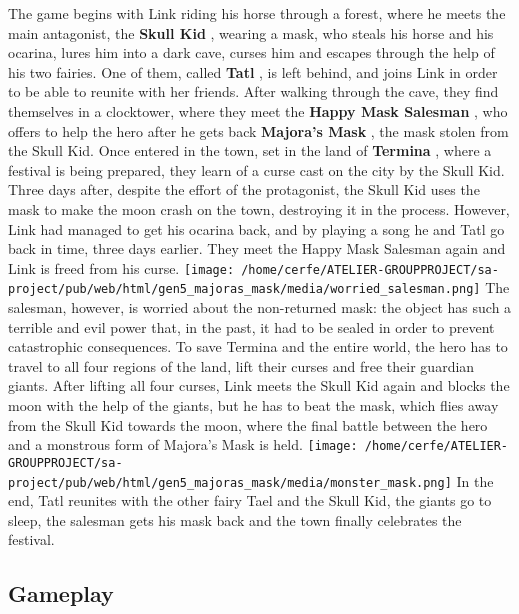 \documentclass[a4paper,10pt]{book}
\begin{document}
          The game begins with Link riding his horse through a forest, where he meets the main antagonist, the  \textbf{Skull Kid } , wearing a mask, who steals his horse and his ocarina, lures him into a dark cave,
          curses him and escapes through the help of his two fairies. One of them, called  \textbf{Tatl } , is left behind, and joins Link in order to be able to reunite with her friends. After walking through the
          cave, they find themselves in a clocktower, where they meet the  \textbf{Happy Mask Salesman } , who offers to help the hero after he gets back  \textbf{Majora's Mask } , the mask stolen from the Skull Kid. 
          Once entered in the town, set in the land of  \textbf{Termina } , where a festival is being prepared, they learn of a curse cast on the city by the Skull Kid. Three days after, despite the effort
          of the protagonist, the Skull Kid uses the mask to make the moon crash on the town, destroying it in the process. However, Link had managed to get his ocarina back, and by playing a song he and Tatl go
          back in time, three days earlier. They meet the Happy Mask Salesman again and Link is freed from his curse. 
 \texttt{[image: /home/cerfe/ATELIER-GROUPPROJECT/sa-project/pub/web/html/gen5\_majoras\_mask/media/worried\_salesman.png]}
          The salesman, however, is worried about the non-returned mask: the object has such a terrible
          and evil power that, in the past, it had to be sealed in order to prevent catastrophic consequences.
          To save Termina and the entire world, the hero has to travel to all four regions of the land, lift their curses and free their guardian giants. After lifting all four curses, Link meets the Skull Kid
          again and blocks the moon with the help of the giants, but he has to beat the mask, which flies away from the Skull Kid towards the moon, where the final battle between the hero and a monstrous form of
          Majora's Mask is held. 
 \texttt{[image: /home/cerfe/ATELIER-GROUPPROJECT/sa-project/pub/web/html/gen5\_majoras\_mask/media/monster\_mask.png]}
          In the end, Tatl reunites with the other fairy Tael and the Skull Kid, the giants go to sleep, the salesman gets his mask back and the town finally celebrates the festival.
         
 \subsection{Gameplay }
 
\end{document}
